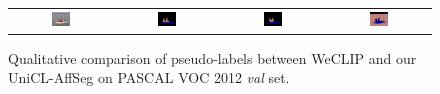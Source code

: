 \begin{figure}[ht]
\begin{tcolorbox}[colframe=black!60, colback=white, boxrule=0.8pt, arc=2pt, left=2pt, right=2pt, top=2pt, bottom=2pt]
\begin{tabular}{cccc}
      \includegraphics[width=0.20\textwidth,height=0.20\textwidth]
      {figures/originals/2010_003599}
                &
      \includegraphics[width=0.20\textwidth,height=0.20\textwidth]
      {figures/colored_gts/2010_003599}
                &
      \includegraphics[width=0.20\textwidth,height=0.20\textwidth]
      {figures/val_labels/weclip/2010_003599_[3, 14]}
                &
      \includegraphics[width=0.20\textwidth,height=0.20\textwidth]
      {figures/val_labels/ours/2010_003599_[3, 14]} \\
    \end{tabular}

    \caption{Qualitative comparison of pseudo-labels between WeCLIP and our UniCL-AffSeg on PASCAL VOC 2012 \textit{val} set.}
    \label{fig:qualitative_comparison_pseudolabel_val}
  \end{tcolorbox}
\end{figure}


